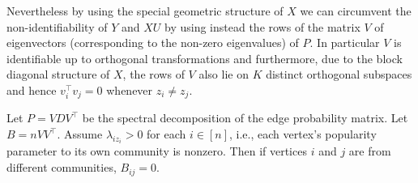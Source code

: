 \documentclass[12pt]{article}
\begin{document}
Nevertheless by using the special geometric structure of $X$ we can circumvent the
non-identifiability of $Y$ and $XU$ by using instead the rows of the
matrix $V$ of eigenvectors (corresponding to the non-zero eigenvalues) of $P$. In particular $V$ is identifiable
up to orthogonal transformations and furthermore, due to the block
diagonal structure of $X$, the rows of $V$ also lie on $K$ distinct orthogonal
subspaces and hence $v_i^{\top} v_j = 0$ whenever $z_i \not = z_j$. 
\begin{theorem}
\label{theorem3}
Let $P = V D V^\top$ be the spectral decomposition 
of the edge probability matrix. 
Let $B = n V V^\top$. 
Assume $\lambda_{i z_i} > 0$ for each $i \in [n]$, 
i.e., each vertex's popularity parameter to its own community is nonzero. 
Then if vertices $i$ and $j$ are from different communities, $B_{ij} = 0$.
\end{theorem}
\end{document}
